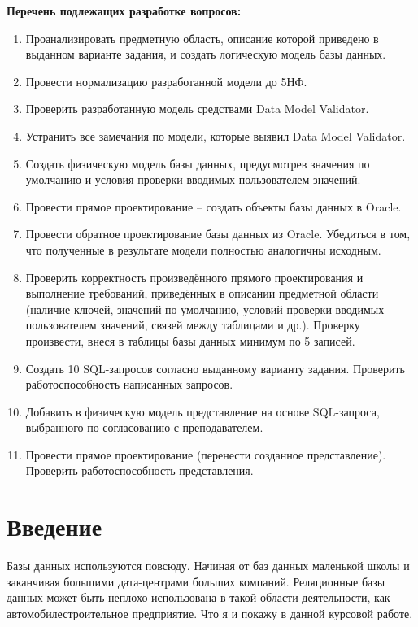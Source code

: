 {\bf Перечень подлежащих разработке вопросов:}
\begin{enumerate}
    \item Проанализировать предметную область, описание которой приведено в выданном варианте задания, и создать логическую модель базы данных.
    \item Провести нормализацию разработанной модели до 5НФ.
    \item Проверить разработанную модель средствами Data Model Validator.
    \item Устранить все замечания по модели, которые выявил Data Model Validator.
    \item Создать физическую модель базы данных, предусмотрев значения по умолчанию и условия проверки вводимых пользователем значений.
    \item Провести прямое проектирование – создать объекты базы данных в Oracle.
    \item Провести обратное проектирование базы данных из Oracle. Убедиться в том, что полученные в результате модели полностью аналогичны исходным.
    \item Проверить корректность произведённого прямого проектирования и выполнение требований, приведённых в описании предметной области (наличие ключей, значений по умолчанию, условий проверки вводимых пользователем значений, связей между таблицами и др.). Проверку произвести, внеся в таблицы базы данных минимум по 5 записей.
    \item Создать 10 SQL-запросов согласно выданному варианту задания. Проверить работоспособность написанных запросов.
    \item Добавить в физическую модель представление на основе SQL-запроса, выбранного по согласованию с преподавателем.
    \item Провести прямое проектирование (перенести созданное представление). Проверить работоспособность представления.
\end{enumerate}

\newpage
\tableofcontents
\newpage

\section{Введение}
Базы данных используются повсюду.
Начиная от баз данных маленькой школы и заканчивая большими дата-центрами больших компаний.
Реляционные базы данных может быть неплохо использована в такой области деятельности, как автомобилестроительное предприятие.
Что я и покажу в данной курсовой работе.

